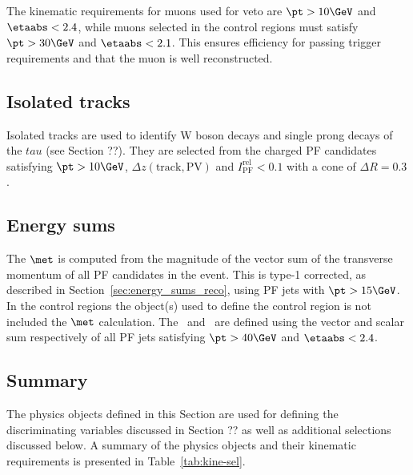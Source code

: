 The kinematic requirements for muons used for veto are $\pt > 10\GeV$ and $\etaabs < 2.4$, while muons 
selected in the control regions must satisfy $\pt > 30\GeV$ and $\etaabs < 2.1$. This ensures efficiency
for passing trigger requirements and that the muon is well reconstructed.


\subsection{Isolated tracks}

Isolated tracks are used to identify W boson decays and single prong decays of the $tau$ (see Section ??). 
They are selected from the charged PF candidates satisfying $\pt > 10\GeV$, $\Delta z(\text{track},\text{PV})$ and 
$I_{\text{PF}}^{\text{rel}} < 0.1$ with a cone of $\Delta R = 0.3$.

\subsection{Energy sums}

The $\met$ is computed from the magnitude of the vector sum of the transverse momentum of all PF candidates in
the event. This is type-1 corrected, as described in Section~\ref{sec:energy_sums_reco}, 
using PF jets with $\pt > 15\GeV$. In the control regions the object(s) used to define
the control region is not included the $\met$ calculation. The \mht~and \scalht~are defined
using the vector and scalar sum respectively of all PF jets satisfying $\pt > 40\GeV$ and $\etaabs < 2.4$.

\subsection{Summary}

The physics objects defined in this Section are used for defining the
discriminating variables discussed in Section ?? as well as additional selections
discussed below. A summary of the physics objects and their
kinematic requirements is presented in Table~\ref{tab:kine-sel}.

